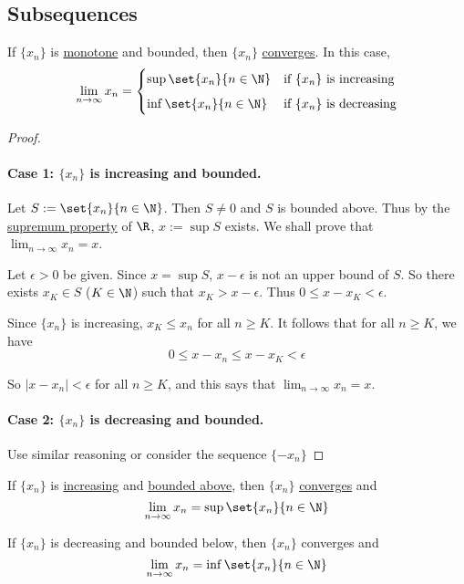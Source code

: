 \subsection{Subsequences}\label{ca43129}

\label{cc11aa4}

If $\{x_n\}$ is \href{feae1b2}{monotone} and bounded, then $\{x_n\}$
\href{de3e28a}{converges}. In this case,
$$
  \lim_{n\to\infty}x_n=\begin{cases}
    \sup\set{x_n}{n\in\N} & \text{if $\{x_n\}$ is increasing} \\[0.5em]
    \inf\set{x_n}{n\in\N} & \text{if $\{x_n\}$ is decreasing}
  \end{cases}
$$

\begin{proof}
  \def\limn{\displaystyle\lim_{n\to\infty}}

  \paragraph{Case 1: $\{x_n\}$ is increasing and bounded.} Let
  $S:=\set{x_n}{n\in\N}$. Then $S\neq0$ and $S$ is bounded above. Thus by the
  \href{f330cf9}{supremum property} of $\R$, $x:=\sup S$ exists. We shall prove
  that $\limn x_n=x$.

  Let $\epsilon>0$ be given. Since $x=\sup S$, $x-\epsilon$ is not an upper
  bound of $S$. So there exists $x_K\in S$ ($K\in\N$) such that
  $x_K>x-\epsilon$. Thus $0\leq x-x_K<\epsilon$.

  Since $\{x_n\}$ is increasing, $x_K\leq x_n$ for all $n\geq K$. It follows
  that for all $n\geq K$, we have
  $$
    0\leq x-x_n\leq x-x_K<\epsilon
  $$

  So $|x-x_n|<\epsilon$ for all $n\geq K$, and this says that $\limn x_n=x$.

  \paragraph{Case 2: $\{x_n\}$ is decreasing and bounded.}

  Use similar reasoning or consider the sequence $\{-x_n\}$
\end{proof}

\label{c28d9a9}

\begin{enumerati}
  \def\limn{\displaystyle\lim_{n\to\infty}}
  \item If $\{x_n\}$ is \href{feae1b2}{increasing} and \href{d5ed299}{bounded
        above}, then $\{x_n\}$ \href{de3e28a}{converges} and
  $$
    \limn x_n=\sup\set{x_n}{n\in\N}
  $$
  \item If $\{x_n\}$ is decreasing and bounded below, then $\{x_n\}$ converges
        and
  $$
    \limn x_n=\inf\set{x_n}{n\in\N}
  $$
\end{enumerati}

